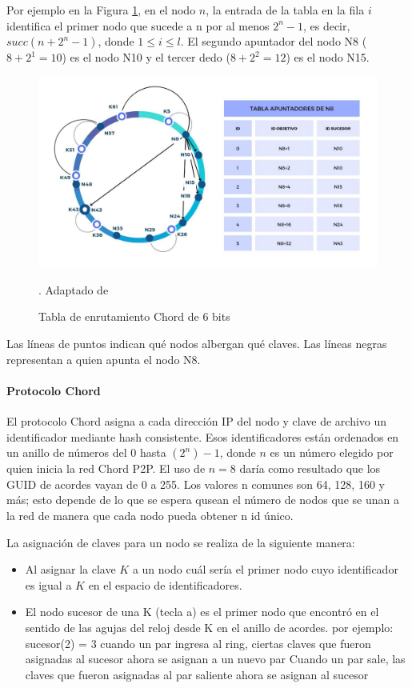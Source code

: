  Por   ejemplo en la Figura \ref{fig:chord-te}, en el nodo $n$, la entrada de la tabla en la fila $i$ identifica el primer nodo que sucede a n por al menos $2^{n}-1$, es decir, $succ(n + 2^{n}-1)$, donde $1 \leq i \leq l$. El segundo apuntador del nodo N8 ($8+2^{1}= 10$) es el nodo N10 y el tercer dedo ($8+2^{2}= 12$)   es el nodo N15. 


\begin{figure}%
			\begin{center}
		\includegraphics[width=0.8\linewidth] {10/3.jpg } 
	\caption{Tabla de enrutamiento Chord de 6 bits}
	\label{fig:chord-te}. Adaptado de \cite{Goetz2005}
			\end{center}
\end{figure}
 
 Las líneas de puntos indican qué nodos albergan qué claves. Las líneas negras representan a quien apunta el nodo N8.

\paragraph{Protocolo Chord}
El protocolo Chord asigna a cada dirección IP del nodo y clave de archivo un identificador mediante hash consistente. Esos identificadores están ordenados en un anillo de números del $0$ hasta $(2^{n})-1$,  donde $n$ es un número elegido por quien inicia la red Chord P2P. El uso de $n = 8$ daría como resultado que los GUID de acordes vayan de 0 a 255. Los valores n comunes son 64, 128, 160 y más; esto depende de lo que se espera qusean el n\'umero de nodos que se unan a la red de manera que cada nodo pueda obtener n id \'unico. 
  
  

La asignación de claves para un nodo se realiza de la siguiente manera:

\begin{itemize}
	\item Al asignar la clave $K$ a un nodo cuál sería el primer nodo cuyo identificador es igual a $K$  en el espacio de identificadores.
	\item El nodo sucesor de una K (tecla a) es el primer nodo que encontró en el sentido de las agujas del reloj desde K en el anillo de acordes.
	por ejemplo: sucesor(2) = 3
	cuando un par ingresa al ring, ciertas claves que fueron asignadas al sucesor ahora se asignan a un nuevo par
	Cuando un par sale, las claves que fueron asignadas al par saliente ahora se asignan al sucesor
\end{itemize}


